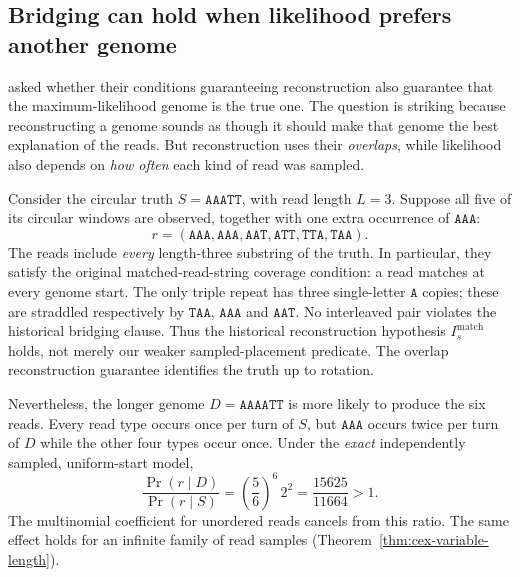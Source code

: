 \subsection{Bridging can hold when likelihood prefers another genome}
\label{sec:intro:two-questions}

\textcite[Discussion]{shomorony2016} asked whether their
conditions guaranteeing reconstruction also guarantee that the
maximum-likelihood genome is the true one. The question is striking
because reconstructing a genome sounds as though it should make that
genome the best explanation of the reads. But reconstruction uses
their \emph{overlaps}, while likelihood also depends on \emph{how
often} each kind of read was sampled.

Consider the circular truth $S=\texttt{AAATT}$, with read length
$L=3$. Suppose all five of its circular windows are observed,
together with one extra occurrence of $\texttt{AAA}$:
\[
  r=(\texttt{AAA},\texttt{AAA},\texttt{AAT},
     \texttt{ATT},\texttt{TTA},\texttt{TAA}).
\]
The reads include \emph{every} length-three substring of the truth.
In particular, they satisfy the original matched-read-string coverage
condition: a read matches at every genome start. The only triple
repeat has three single-letter $\texttt{A}$ copies; these are
straddled respectively by $\texttt{TAA}$, $\texttt{AAA}$ and
$\texttt{AAT}$. No interleaved pair violates the historical bridging
clause. Thus the historical reconstruction hypothesis
$I_s^{\mathrm{match}}$ holds, not merely our weaker
sampled-placement predicate. The overlap reconstruction guarantee
identifies the truth up to rotation.

Nevertheless, the longer genome $D=\texttt{AAAATT}$ is more likely to
produce the six reads. Every read type occurs once per turn of $S$,
but $\texttt{AAA}$ occurs twice per turn of $D$ while the other
four types occur once. Under the \emph{exact} independently sampled,
uniform-start model,
\[
  \frac{\Pr(r\mid D)}{\Pr(r\mid S)}
   = \left(\frac{5}{6}\right)^6\,2^2
   =\frac{15625}{11664}>1.
\]
The multinomial coefficient for unordered reads cancels from this
ratio. The same effect holds for an infinite family of read samples
(Theorem~\ref{thm:cex-variable-length}).


